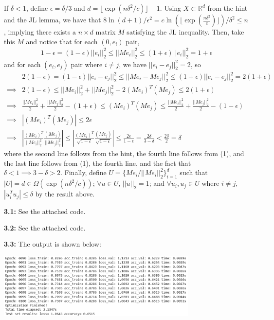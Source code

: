 \documentclass[12pt]{article}
\begin{document}
If $\delta < 1$, define $\epsilon = \delta/3$ and $d = \lfloor \exp(n\delta^2/c) \rfloor - 1$. Using $X \subset \mathbb{R}^d$ from the hint and the JL lemma, we have that $8\ln(d+1)/\epsilon^2 = c\ln(\lfloor \exp(\frac{n\delta^2}{c}) \rfloor)/\delta^2 \leq n$, implying there exists a $n\times d$ matrix $M$ satisfying the JL inequality. Then, take this $M$ and notice that for each $(0,e_i)$ pair, \begin{align}
        1-\epsilon = (1-\epsilon)||e_i||_2^2 \leq ||Me_i||_2^2 \leq (1+\epsilon)||e_i||_2^2 = 1+\epsilon
\end{align} and for each $(e_i,e_j)$ pair where $i\neq j$, we have $||e_i-e_j||_2^2 = 2$, so \begin{align*}
    &2(1-\epsilon) = (1-\epsilon)||e_i-e_j||_2^2 \leq ||Me_i-Me_j||_2^2 \leq (1+\epsilon)||e_i-e_j||_2^2 = 2(1+\epsilon)\\
    \implies &2(1-\epsilon) \leq ||Me_i||_2^2 + ||Me_j||_2^2 - 2(Me_i)^T(Me_j) \leq 2(1+\epsilon)\\
    \implies &\frac{||Me_i||_2^2}{2} + \frac{||Me_j||_2^2}{2} - (1+\epsilon) \leq (Me_i)^T(Me_j) \leq \frac{||Me_i||_2^2}{2} + \frac{||Me_j||_2^2}{2} - (1-\epsilon)\\
    \implies &|(Me_i)^T(Me_j)| \leq 2\epsilon\\
    \implies &\left| \frac{(Me_i)^T}{||Me_i||_2^2} \frac{(Me_j)}{||Me_j||_2^2} \right| \leq \left|\frac{(Me_i)^T}{\sqrt{1-\epsilon}} \frac{(Me_j)}{\sqrt{1-\epsilon}} \right| \leq \frac{2\epsilon}{1-\epsilon} = \frac{2\delta}{3-\delta} < \frac{2\delta}{2} = \delta
\end{align*} where the second line follows from the hint, the fourth line follows from (1), and the last line follows from (1), the fourth line, and the fact that $\delta < 1 \implies 3 - \delta > 2$. Finally, define $U = \{Me_i/||Me_i||_2^2\}_{i=1}^d$ such that $|U| = d \in \Omega(\exp(n\delta^2/c))$; $\forall u\in U$, $||u||_2 = 1$; and $\forall u_i,u_j\in U$ where $i\neq j$, $|u_i^Tu_j| \leq \delta$ by the result above.

\textbf{3.1:} See the attached code.

\textbf{3.2:} See the attached code.

\textbf{3.3:} The output is shown below:
\begin{center}
    \includegraphics[width=0.75\textwidth]{3.3.png}
\end{center}
\end{document}
